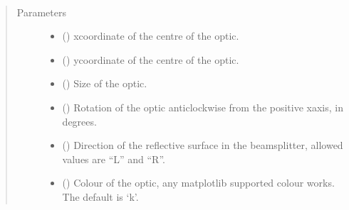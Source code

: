 \documentclass[letterpaper,10pt,english]{sphinxmanual}
\begin{document}
\begin{fulllineitems}
\begin{fulllineitems}
\label{\detokenize{index:pyopticaltable.OpticalTable.beamsplitter_cube}}~\begin{quote}\begin{description}
\item[{Parameters}] \leavevmode\begin{itemize}
\item {} 
\sphinxAtStartPar
{} () \textendash{} x\sphinxhyphen{}coordinate of the centre of the optic.

\item {} 
\sphinxAtStartPar
{} () \textendash{} y\sphinxhyphen{}coordinate of the centre of the optic.

\item {} 
\sphinxAtStartPar
{} () \textendash{} Size of the optic.

\item {} 
\sphinxAtStartPar
{} () \textendash{} Rotation of the optic anticlockwise from the positive x\sphinxhyphen{}axis, in degrees.

\item {} 
\sphinxAtStartPar
{} () \textendash{} Direction of the reflective surface in the beamsplitter, allowed
values are “L” and “R”.

\item {} 
\sphinxAtStartPar
{} (\sphinxstyleliteralemphasis{\sphinxupquote{, }}) \textendash{} Colour of the optic, any matplotlib supported colour works. The default is ‘k’.


\end{itemize}
\end{description}
\end{quote}
\end{fulllineitems}
\end{fulllineitems}
\end{document}
